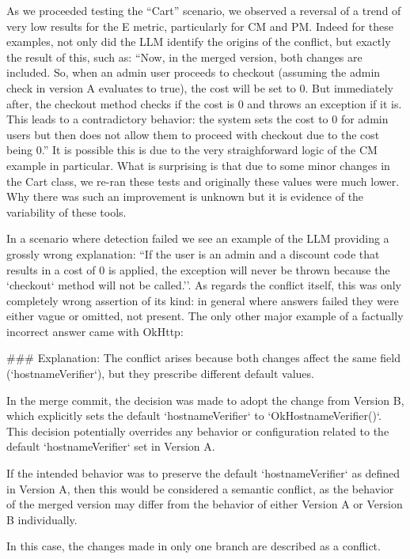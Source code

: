 As we proceeded testing the ``Cart'' scenario, we observed a reversal of a trend of very low results for the E metric, particularly for CM and PM.
Indeed for these examples, not only did the LLM identify the origins of the conflict, but exactly the result of this, such as:
``Now, in the merged version, both changes are included. So, when an admin user proceeds to checkout (assuming the admin check in version A evaluates to true), the cost will be set to 0. But immediately after, the checkout method checks if the cost is 0 and throws an exception if it is. This leads to a contradictory behavior: the system sets the cost to 0 for admin users but then does not allow them to proceed with checkout due to the cost being 0.''
It is possible this is due to the very straighforward logic of the CM example in particular. What is surprising is that due to some minor changes in the Cart class, we re-ran these tests and originally these values were much lower. Why there was such an improvement is unknown but it is evidence of the variability of these tools.

In a scenario where detection failed we see an example of the LLM providing a grossly wrong explanation: ``If the user is an admin and a discount code that results in a cost of 0 is applied, the exception will never be thrown because the `checkout` method will not be called.''. As regards the conflict itself, this was only completely wrong assertion of its kind: in general where answers failed they were either vague or omitted, not present. The only other major example of a factually incorrect answer came with OkHttp:
\begin{response}
### Explanation:
The conflict arises because both changes affect the same field (`hostnameVerifier`), but they prescribe different default values.

In the merge commit, the decision was made to adopt the change from Version B, which explicitly sets the default `hostnameVerifier` to `OkHostnameVerifier()`. This decision potentially overrides any behavior or configuration related to the default `hostnameVerifier` set in Version A.

If the intended behavior was to preserve the default `hostnameVerifier` as defined in Version A, then this would be considered a semantic conflict, as the behavior of the merged version may differ from the behavior of either Version A or Version B individually.
\end{response}
In this case, the changes made in only one branch are described as a conflict.

